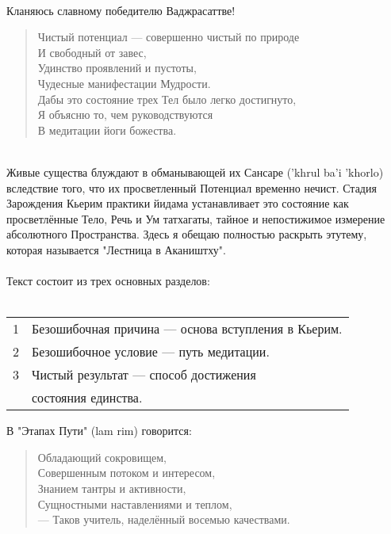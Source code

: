 \normalsize
{}
\\
Кланяюсь славному победителю Ваджрасаттве!

\begin{verse}
Чистый потенциал — совершенно чистый по природе\\
И свобод\-ный от завес,\\
Удинство проявлений и пустоты,\\
Чудесные мани\-фестации Мудрости.\\
Дабы это состояние трех Тел было легко достигнуто,\\
Я объясню то, чем руководствуются\\
В медитации йоги божества.
\end{verse}
\\
Живые существа блуждают в обманывающей их Сансаре ('khrul ba'i 'khorlo)
вследствие того, что их просветленный Потенциал временно нечист.
Стадия Зарождения Кьерим практики йидама устанавливает это
состояние как просветлённые Тело, Речь и Ум татхагаты, тайное
и непостижимое измерение абсолютного Пространства. Здесь я
обещаю полностью раскрыть этутему, которая называется
"Лестница в Акаништху".\\
\\
Текст состоит из трех основных разделов:\\
\\
\begin{tabular}{ll}
1 & Безошибочная причина — основа вступления в Кьерим.\\
2 & Безошибочное условие — путь медитации.\\
3 & Чистый результат — способ достижения \\
  & состояния единства.\\
\end{tabular}
\newpage
{}
\normalsize
\Vspace{1cm}
В "Этапах Пути" (lam rim) говорится:

\begin{verse}
Обладающий сокровищем,\\
Совершенным потоком и интересом,\\
Знанием тантры и активности,\\
Сущностными наставлениями и теплом,\\
— Таков учитель, наделённый восемью качествами.
\end{verse}


